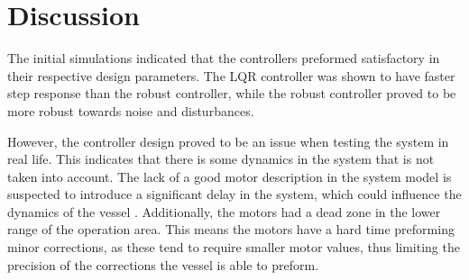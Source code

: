\chapter{Discussion}\label{chap:discussion}


The initial simulations indicated that the controllers preformed satisfactory in their respective design parameters. 
The LQR controller was shown to have faster step response than the robust controller, while the robust controller proved to be more robust towards noise and disturbances. 

However, the controller design proved to be an  issue when testing the system in real life. 
This indicates that there is some dynamics in the system that is not taken into account. 
The lack of a good motor description in the system model is suspected to introduce a significant delay in the system, which could influence the dynamics of the vessel . 
Additionally, the motors had a dead zone in the lower range of the operation area. 
This means the motors have a hard time preforming minor corrections, as these tend to require smaller motor values, thus limiting the precision of the corrections the vessel is able to preform. 



